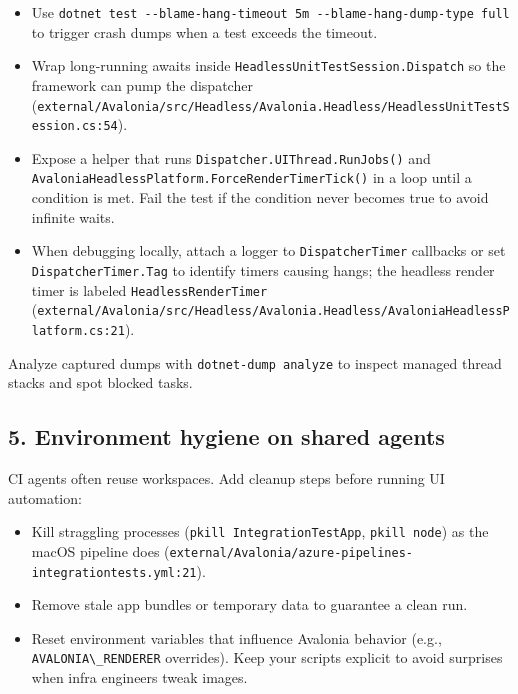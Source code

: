 \begin{itemize}
\tightlist
\item
  Use
  \passthrough{\lstinline!dotnet test --blame-hang-timeout 5m --blame-hang-dump-type full!}
  to trigger crash dumps when a test exceeds the timeout.
\item
  Wrap long-running awaits inside
  \passthrough{\lstinline!HeadlessUnitTestSession.Dispatch!} so the
  framework can pump the dispatcher
  (\passthrough{\lstinline!external/Avalonia/src/Headless/Avalonia.Headless/HeadlessUnitTestSession.cs:54!}).
\item
  Expose a helper that runs
  \passthrough{\lstinline!Dispatcher.UIThread.RunJobs()!} and
  \passthrough{\lstinline!AvaloniaHeadlessPlatform.ForceRenderTimerTick()!}
  in a loop until a condition is met. Fail the test if the condition
  never becomes true to avoid infinite waits.
\item
  When debugging locally, attach a logger to
  \passthrough{\lstinline!DispatcherTimer!} callbacks or set
  \passthrough{\lstinline!DispatcherTimer.Tag!} to identify timers
  causing hangs; the headless render timer is labeled
  \passthrough{\lstinline!HeadlessRenderTimer!}
  (\passthrough{\lstinline!external/Avalonia/src/Headless/Avalonia.Headless/AvaloniaHeadlessPlatform.cs:21!}).
\end{itemize}

Analyze captured dumps with
\passthrough{\lstinline!dotnet-dump analyze!} to inspect managed thread
stacks and spot blocked tasks.

\subsection{5. Environment hygiene on shared
agents}\label{environment-hygiene-on-shared-agents}

CI agents often reuse workspaces. Add cleanup steps before running UI
automation:

\begin{itemize}
\tightlist
\item
  Kill straggling processes
  (\passthrough{\lstinline!pkill IntegrationTestApp!},
  \passthrough{\lstinline!pkill node!}) as the macOS pipeline does
  (\passthrough{\lstinline!external/Avalonia/azure-pipelines-integrationtests.yml:21!}).
\item
  Remove stale app bundles or temporary data to guarantee a clean run.
\item
  Reset environment variables that influence Avalonia behavior (e.g.,
  \passthrough{\lstinline!AVALONIA\_RENDERER!} overrides). Keep your
  scripts explicit to avoid surprises when infra engineers tweak images.
\end{itemize}

